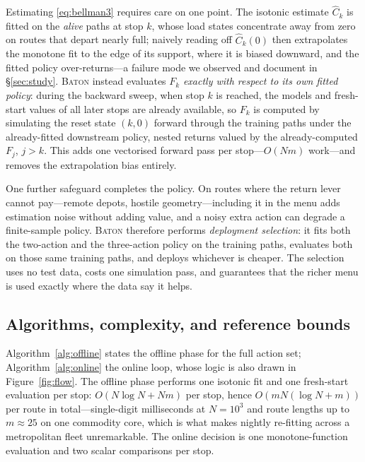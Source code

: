 \documentclass[preprint,authoryear,12pt]{elsarticle}
\theoremstyle{definition}
\theoremstyle{remark}
\begin{document}
Estimating \eqref{eq:bellman3} requires care on one point. The isotonic
estimate $\widehat C_k$ is fitted on the \emph{alive} paths at stop $k$,
whose load states concentrate away from zero on routes that depart
nearly full; naively reading off $\widehat C_k(0)$ then extrapolates the
monotone fit to the edge of its support, where it is biased downward,
and the fitted policy over-returns---a failure mode we observed and
document in \S\ref{sec:study}. \textsc{Baton} instead evaluates $F_k$
\emph{exactly with respect to its own fitted policy}: during the
backward sweep, when stop $k$ is reached, the models and fresh-start
values of all later stops are already available, so $F_k$ is computed by
simulating the reset state $(k,0)$ forward through the training paths
under the already-fitted downstream policy, nested returns valued by the
already-computed $F_j$, $j > k$. This adds one vectorised forward pass
per stop---$O(Nm)$ work---and removes the extrapolation bias entirely.

One further safeguard completes the policy. On routes where the return
lever cannot pay---remote depots, hostile geometry---including it in the
menu adds estimation noise without adding value, and a noisy extra
action can degrade a finite-sample policy. \textsc{Baton} therefore
performs \emph{deployment selection}: it fits both the two-action and
the three-action policy on the training paths, evaluates both on those
same training paths, and deploys whichever is cheaper. The selection
uses no test data, costs one simulation pass, and guarantees that the
richer menu is used exactly where the data say it helps.

\subsection{Algorithms, complexity, and reference bounds}
\label{sec:algorithms}

Algorithm~\ref{alg:offline} states the offline phase for the full
action set; Algorithm~\ref{alg:online} the online loop, whose logic is
also drawn in Figure~\ref{fig:flow}. The offline phase performs one
isotonic fit and one fresh-start evaluation per stop:
$O(N \log N + Nm)$ per stop, hence $O(mN(\log N + m))$ per route in
total---single-digit milliseconds at $N = 10^3$ and route lengths up to
$m \approx 25$ on one commodity core, which is what makes nightly
re-fitting across a metropolitan fleet unremarkable. The online decision
is one monotone-function evaluation and two scalar comparisons per stop.
\end{document}
